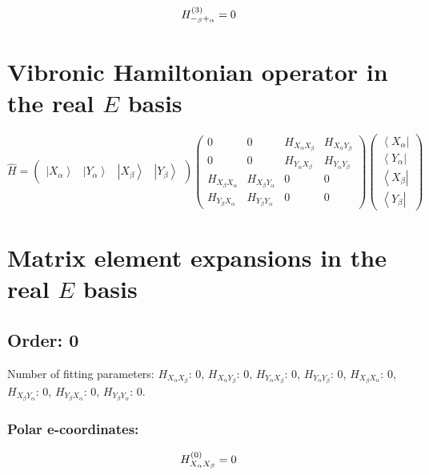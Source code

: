 \documentclass[fleqn]{article}
\begin{document}
\begin{dmath*}
H_{-_{\beta}+_{\alpha}}^{(3)}=0\\
\end{dmath*}

\section{Vibronic Hamiltonian operator in the real $E$ basis}
$\hat{H}=\left(\begin{matrix}{\left|X_\alpha\right\rangle } & {\left|Y_\alpha\right\rangle } & {\left|X_\beta\right\rangle } & {\left|Y_\beta\right\rangle }\end{matrix}\right) \left(\begin{matrix}0 & 0 & H_{X_{\alpha}X_{\beta}} & H_{X_{\alpha}Y_{\beta}}\\0 & 0 & H_{Y_{\alpha}X_{\beta}} & H_{Y_{\alpha}Y_{\beta}}\\H_{X_{\beta}X_{\alpha}} & H_{X_{\beta}Y_{\alpha}} & 0 & 0\\H_{Y_{\beta}X_{\alpha}} & H_{Y_{\beta}Y_{\alpha}} & 0 & 0\end{matrix}\right) \left(\begin{matrix}{\left\langle X_\alpha\right|}\\{\left\langle Y_\alpha\right|}\\{\left\langle X_\beta\right|}\\{\left\langle Y_\beta\right|}\end{matrix}\right)$
\section{Matrix element expansions in the real $E$ basis}
\subsection{Order: 0}
Number of fitting parameters: $H_{X_{\alpha}X_{\beta}}$: $0$, $H_{X_{\alpha}Y_{\beta}}$: $0$, $H_{Y_{\alpha}X_{\beta}}$: $0$, $H_{Y_{\alpha}Y_{\beta}}$: $0$, $H_{X_{\beta}X_{\alpha}}$: $0$, $H_{X_{\beta}Y_{\alpha}}$: $0$, $H_{Y_{\beta}X_{\alpha}}$: $0$, $H_{Y_{\beta}Y_{\alpha}}$: $0$.
\subsubsection*{Polar e-coordinates:}

\begin{dmath*}
H_{X_{\alpha}X_{\beta}}^{(0)}=0\\
\end{dmath*}
\end{document}
